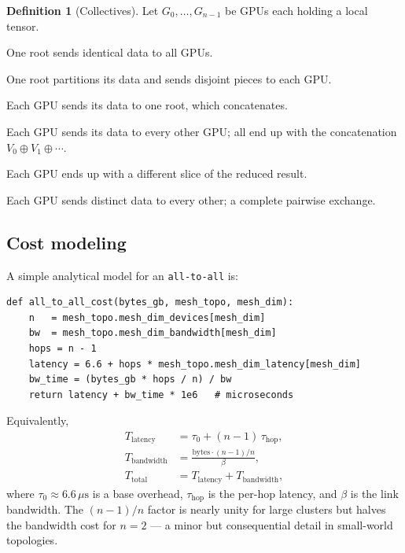 \documentclass[11pt,a4paper]{article}
\theoremstyle{definition}
\newtheorem{definition}{Definition}[section]
\theoremstyle{remark}
\theoremstyle{plain}
\newcommand{\us}{\,\mu\text{s}}
\begin{document}
\begin{definition}[Collectives]
Let $G_0, \dots, G_{n-1}$ be GPUs each holding a local tensor.
\begin{description}[leftmargin=1.5em,itemsep=0.2em]
    \item[Broadcast] One root sends identical data to all GPUs.
    \item[Scatter] One root partitions its data and sends disjoint pieces to each GPU.
    \item[Gather] Each GPU sends its data to one root, which concatenates.
    \item[All-Gather] Each GPU sends its data to every other GPU; all end up with the concatenation $V_0 \oplus V_1 \oplus \cdots$.
    \item[Reduce-Scatter] Each GPU ends up with a different slice of the reduced result.
    \item[All-to-All] Each GPU sends distinct data to every other; a complete pairwise exchange.
\end{description}
\end{definition}

\subsection{Cost modeling}

A simple analytical model for an \texttt{all-to-all} is:

\begin{lstlisting}
def all_to_all_cost(bytes_gb, mesh_topo, mesh_dim):
    n   = mesh_topo.mesh_dim_devices[mesh_dim]
    bw  = mesh_topo.mesh_dim_bandwidth[mesh_dim]
    hops = n - 1
    latency = 6.6 + hops * mesh_topo.mesh_dim_latency[mesh_dim]
    bw_time = (bytes_gb * hops / n) / bw
    return latency + bw_time * 1e6   # microseconds
\end{lstlisting}

Equivalently,
\begin{align}
T_{\text{latency}} &= \tau_0 + (n-1)\, \tau_{\text{hop}}, \\
T_{\text{bandwidth}} &= \frac{\text{bytes} \cdot (n-1)/n}{\beta}, \\
T_{\text{total}} &= T_{\text{latency}} + T_{\text{bandwidth}},
\end{align}
where $\tau_0 \approx 6.6\us$ is a base overhead, $\tau_{\text{hop}}$ is the per-hop latency, and $\beta$ is the link bandwidth. The $(n-1)/n$ factor is nearly unity for large clusters but halves the bandwidth cost for $n=2$ --- a minor but consequential detail in small-world topologies.
\end{document}
